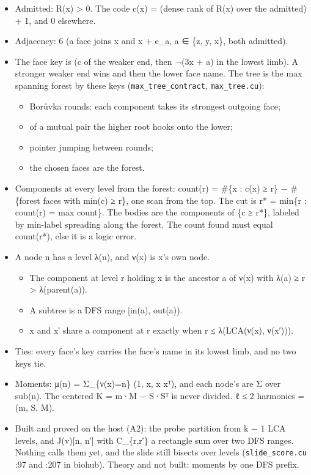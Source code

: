 \begin{itemize}
\item Admitted: R(x) > 0. The code c(x) = (dense rank of R(x) over the admitted) + 1, and 0 elsewhere.
\item Adjacency: 6 (a face joins x and x + e\_\allowbreak{}a, a ∈ \{z, y, x\}, both admitted).
\item The face key is (c of the weaker end, then ¬(3x + a) in the lowest limb). A stronger weaker end wins and then the lower face name. The tree is the max spanning forest by these keys (\texttt{max\_\allowbreak{}tree\_\allowbreak{}contract}, \texttt{max\_\allowbreak{}tree.\allowbreak{}cu}):

\begin{itemize}
\item Borůvka rounds: each component takes its strongest outgoing face;
\item of a mutual pair the higher root hooks onto the lower;
\item pointer jumping between rounds;
\item the chosen faces are the forest.
\end{itemize}
\item Components at every level from the forest: count(r) = \#\{x : c(x) ≥ r\} − \#\{forest faces with min(c) ≥ r\}, one scan from the top. The cut is r* = min\{r : count(r) = max count\}. The bodies are the components of \{c ≥ r*\}, labeled by min-label spreading along the forest. The count found must equal count(r*), else it is a logic error.
\item A node n has a level λ(n), and ν(x) is x's own node.

\begin{itemize}
\item The component at level r holding x is the ancestor a of ν(x) with λ(a) ≥ r > λ(parent(a)).
\item A subtree is a DFS range [in(a), out(a)).
\item x and x′ share a component at r exactly when r ≤ λ(LCA(ν(x), ν(x′))).
\end{itemize}
\item Ties: every face's key carries the face's name in its lowest limb, and no two keys tie.
\item Moments: μ(n) = Σ\_\allowbreak{}\{ν(x)=n\} (1, x, x xᵀ), and each node's are Σ over sub(n). The centered K = m·M − S·Sᵀ is never divided. ℓ ≤ 2 harmonics = (m, S, M).
\item Built and proved on the host (A2): the probe partition from k − 1 LCA levels, and J(v)[n, n′] with C\_\allowbreak{}\{r,r′\} a rectangle sum over two DFS ranges. Nothing calls them yet, and the slide still bisects over levels (\texttt{slide\_\allowbreak{}score.\allowbreak{}cu} :97 and :207 in biohub). Theory and not built: moments by one DFS prefix.
\end{itemize}

